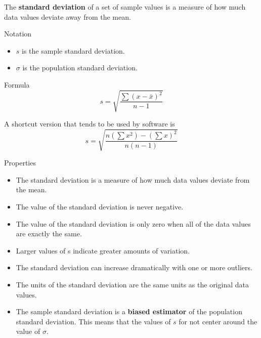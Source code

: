 \documentclass{beamer}
\begin{document}
\begin{frame}
\begin{definition}
The \textbf{standard deviation} of a set of sample values is a measure of how much data values deviate away from the mean.
\end{definition}\pause

\begin{block}{Notation}
\begin{itemize}
\item $s$ is the sample standard deviation.
\item $\sigma$ is the population standard deviation.
\end{itemize}
\end{block}\pause

\begin{block}{Formula}
\begin{equation*}
s = \sqrt{\dfrac{\sum {(x-\bar{x})}^2}{n-1}}
\end{equation*}\pause

A shortcut version that tends to be used by software is
\begin{equation*}
s = \sqrt{\dfrac{n(\sum x^2)-{(\sum x)}^2}{n(n-1)}}
\end{equation*}
\end{block}
\end{frame}

\begin{frame}
\begin{block}{Properties}
\begin{itemize}[<+- | alert@+>]
\item The standard deviation is a measure of how much data values deviate from the mean.
\item The value of the standard deviation is never negative.
\item The value of the standard deviation is only zero when all of the data values are exactly the same.
\item Larger values of s indicate greater amounts of variation.
\item The standard deviation can increase dramatically with one or more outliers.
\item The units of the standard deviation are the same units as the original data values.
\item The sample standard deviation is a \textbf{biased estimator} of the population standard deviation. This means that the values of $s$ for not center around the value of $\sigma$.
\end{itemize}
\end{block}
\end{frame}
\end{document}
